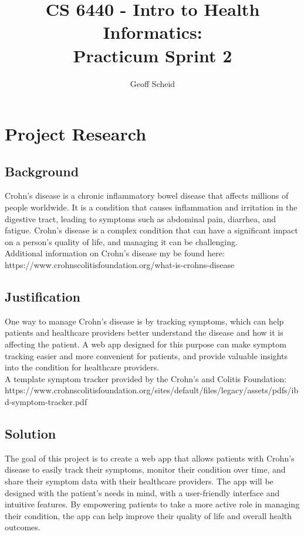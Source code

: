 \documentclass[letterpaper]{jdf}
\author{Geoff Scheid}
\title{CS 6440 - Intro to Health Informatics:\\Practicum Sprint 2}
\begin{document}
\maketitle

\section{Project Research}
    \subsection{Background}
    Crohn's disease is a chronic inflammatory bowel disease that affects millions of people worldwide.
    It is a condition that causes inflammation and irritation in the digestive tract, 
    leading to symptoms such as abdominal pain, diarrhea, and fatigue. 
    Crohn's disease is a complex condition that can have a significant impact on a person's quality of life, 
    and managing it can be challenging.\\
    Additional information on Crohn's disease my be found here:\\
    https://www.crohnscolitisfoundation.org/what-is-crohns-disease

    \subsection{Justification}
    One way to manage Crohn's disease is by tracking symptoms, 
    which can help patients and healthcare providers better understand the disease and how it is affecting the patient. 
    A web app designed for this purpose can make symptom tracking easier and more convenient for patients, 
    and provide valuable insights into the condition for healthcare providers.\\
    A template symptom tracker provided by the Crohn's and Colitis Foundation:\\
    https://www.crohnscolitisfoundation.org/sites/default/files/legacy/assets/pdfs/ibd-symptom-tracker.pdf

    \subsection{Solution}
    The goal of this project is to create a web app that allows patients with Crohn's disease to easily track their symptoms, 
    monitor their condition over time, and share their symptom data with their healthcare providers. 
    The app will be designed with the patient's needs in mind, with a user-friendly interface and intuitive features. 
    By empowering patients to take a more active role in managing their condition, 
    the app can help improve their quality of life and overall health outcomes.
\end{document}
